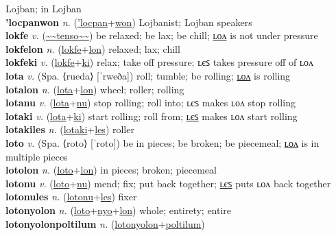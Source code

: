 Lojban; in Lojban \label{'locpanak} \\
\textbf{'locpanwon} \textit{n.} (\hyperref['locpan]{'locpan}+\hyperref[won]{won})
Lojbanist; Lojban speakers \label{'locpanwon} \\
\textbf{lokfe} \textit{v.} (\hyperref[tenso]{\~{}\~{}tenso\~{}\~{}})
be relaxed; be lax; be chill; \hyperref[lokfelon]{ʟᴏᴧ} is not under pressure \label{lokfe} \\
\textbf{lokfelon} \textit{n.} (\hyperref[lokfe]{lokfe}+\hyperref[lon]{lon})
relaxed; lax; chill \label{lokfelon} \\
\textbf{lokfeki} \textit{v.} (\hyperref[lokfe]{lokfe}+\hyperref[ki]{ki})
relax; take off pressure; ʟєꜱ takes pressure off of ʟᴏᴧ \label{lokfeki} \\
\textbf{lota} \textit{v.} (Spa. ⟨rueda⟩ [ˈrweða])
roll; tumble; be rolling; \hyperref[lotalon]{ʟᴏᴧ} is rolling \label{lota} \\
\textbf{lotalon} \textit{n.} (\hyperref[lota]{lota}+\hyperref[lon]{lon})
wheel; roller; rolling \label{lotalon} \\
\textbf{lotanu} \textit{v.} (\hyperref[lota]{lota}+\hyperref[nu]{nu})
stop rolling; roll into; ʟєꜱ makes ʟᴏᴧ stop rolling \label{lotanu} \\
\textbf{lotaki} \textit{v.} (\hyperref[lota]{lota}+\hyperref[ki]{ki})
start rolling; roll from; \hyperref[lotakiles]{ʟєꜱ} makes ʟᴏᴧ start rolling \label{lotaki} \\
\textbf{lotakiles} \textit{n.} (\hyperref[lotaki]{lotaki}+\hyperref[les]{les})
roller \label{lotakiles} \\
\textbf{loto} \textit{v.} (Spa. ⟨roto⟩ [ˈroto])
be in pieces; be broken; be piecemeal; \hyperref[lotolon]{ʟᴏᴧ} is in multiple pieces \label{loto} \\
\textbf{lotolon} \textit{n.} (\hyperref[loto]{loto}+\hyperref[lon]{lon})
in pieces; broken; piecemeal \label{lotolon} \\
\textbf{lotonu} \textit{v.} (\hyperref[loto]{loto}+\hyperref[nu]{nu})
mend; fix; put back together; \hyperref[lotonules]{ʟєꜱ} puts ʟᴏᴧ back together \label{lotonu} \\
\textbf{lotonules} \textit{n.} (\hyperref[lotonu]{lotonu}+\hyperref[les]{les})
fixer \label{lotonules} \\
\textbf{lotonyolon} \textit{n.} (\hyperref[loto]{loto}+\hyperref[nyo]{nyo}+\hyperref[lon]{lon})
whole; entirety; entire \label{lotonyolon} \\
\textbf{lotonyolonpoltilum} \textit{n.} (\hyperref[lotonyolon]{lotonyolon}+\hyperref[poltilum]{poltilum})
